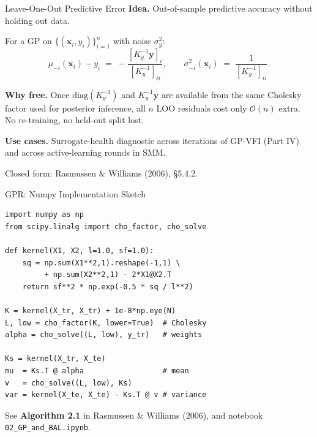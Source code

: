 \documentclass[aspectratio=169,11pt]{beamer}
\newcommand{\x}{\bm{x}}
\begin{document}
\begin{frame}{Leave-One-Out Predictive Error}
\textbf{Idea.} Out-of-sample predictive accuracy without holding out data.

\smallskip
For a GP on $\{(\x_i, y_i)\}_{i=1}^n$ with noise $\sigma_y^2$:
\begin{equation*}
\mu_{-i}(\x_i) - y_i \;=\; -\frac{[K_y^{-1}\bm y]_i}{[K_y^{-1}]_{ii}}, \qquad
\sigma_{-i}^2(\x_i) \;=\; \frac{1}{[K_y^{-1}]_{ii}}.
\end{equation*}

\smallskip
\textbf{Why free.} Once $\mathrm{diag}(K_y^{-1})$ and $K_y^{-1}\bm y$ are available from the same Cholesky factor used for posterior inference, all $n$ LOO residuals cost only $\mathcal O(n)$ extra. No re-training, no held-out split lost.

\smallskip
\textbf{Use cases.} Surrogate-health diagnostic across iterations of GP-VFI (Part IV) and across active-learning rounds in SMM.

\medskip
{\scriptsize Closed form: Rasmussen \& Williams (2006), \S5.4.2.}
\end{frame}

\begin{frame}[fragile]{GPR: Numpy Implementation Sketch}
\begin{lstlisting}[basicstyle=\footnotesize\ttfamily]
import numpy as np
from scipy.linalg import cho_factor, cho_solve

def kernel(X1, X2, l=1.0, sf=1.0):
    sq = np.sum(X1**2,1).reshape(-1,1) \
         + np.sum(X2**2,1) - 2*X1@X2.T
    return sf**2 * np.exp(-0.5 * sq / l**2)

K = kernel(X_tr, X_tr) + 1e-8*np.eye(N)
L, low = cho_factor(K, lower=True)  # Cholesky
alpha = cho_solve((L, low), y_tr)   # weights

Ks = kernel(X_tr, X_te)
mu  = Ks.T @ alpha                  # mean
v   = cho_solve((L, low), Ks)
var = kernel(X_te, X_te) - Ks.T @ v # variance
\end{lstlisting}

\vspace{0.2cm}
{\small See \textbf{Algorithm 2.1} in Rasmussen \& Williams (2006), and notebook \texttt{02\_GP\_and\_BAL.ipynb}.}
\end{frame}
\end{document}
